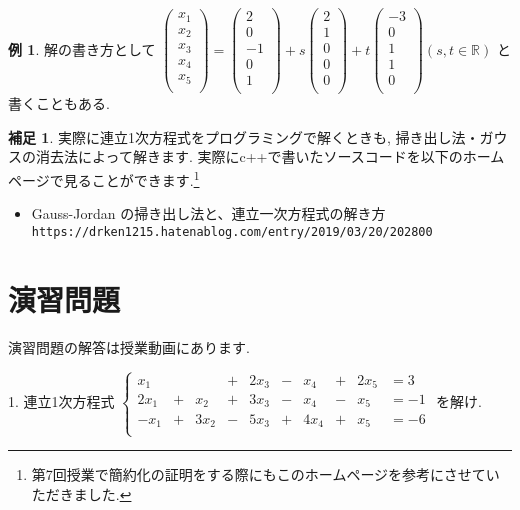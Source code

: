 \documentclass[dvipdfmx,a4paper,11pt]{article}
\newcommand{\R}{\mathbb{R}}
\theoremstyle{definition}
\newtheorem{exa}[thm]{例}
\newtheorem{rema}[thm]{補足}
\begin{document}
\begin{exa}
解の書き方として
$
\begin{pmatrix}
x_1\\
x_2 \\
x_3 \\
x_4 \\
x_5 \\
\end{pmatrix}
=
\begin{pmatrix}
2\\
0 \\
-1 \\
0\\
1 \\
\end{pmatrix}
+ s
\begin{pmatrix}
2\\
1\\
0\\
0\\
0 \\
\end{pmatrix}
+ t
\begin{pmatrix}
-3\\
0\\
1\\
1\\
0 \\
\end{pmatrix}
(s, t \in \R)
$
と書くこともある.

 \end{exa}

\begin{rema}
実際に連立1次方程式をプログラミングで解くときも, 掃き出し法・ガウスの消去法によって解きます. 実際にc++で書いたソースコードを以下のホームページで見ることができます.\footnote{第7回授業で簡約化の証明をする際にもこのホームページを参考にさせていただきました.}
\begin{itemize}
\item Gauss-Jordan の掃き出し法と、連立一次方程式の解き方 \\
 \texttt{https://drken1215.hatenablog.com/entry/2019/03/20/202800}
\end{itemize}
\end{rema}

\section{演習問題}
演習問題の解答は授業動画にあります.

1.
連立1次方程式
 $
 \left\{ 
\begin{matrix}
x_1& &         &  +& 2x_3&- &x_4&+ & 2x_5&= 3 \\
2x_1&+&x_2& + &3x_3&-&x_4&-&x_5&= -1 \\
-x_1&+&3x_2& - &5x_3&+&4x_4&+&x_5&= -6 \\
\end{matrix}
\right.
 $
 を解け.

 
\end{document}
